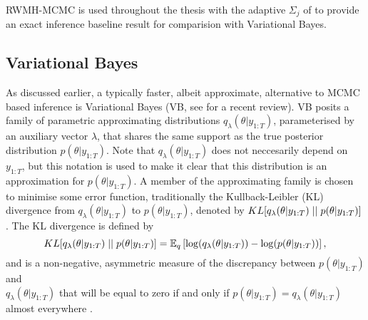 \documentclass[
12pt, %
onehalfspacing, %
nohyperref, %
headsepline, %
chapterinoneline, %
]{MastersDoctoralThesis} %
\begin{document}
RWMH-MCMC is used throughout the thesis with the adaptive $\Sigma_j$ of \citet{Garthwaite2016} to provide an exact inference baseline result for comparision with Variational Bayes.

\subsection{Variational Bayes} \label{subsec:VB}

As discussed earlier, a typically faster, albeit approximate, alternative to MCMC based inference is Variational Bayes (VB, see \citet{Blei2017} for a recent review). VB posits a family of parametric approximating distributions $q_{\lambda}(\theta | y_{1:T})$, parameterised by an auxiliary vector $\lambda$, that shares the same support as the true posterior distribution $p(\theta | y_{1:T})$. Note that $q_{\lambda}(\theta | y_{1:T})$ does not neccesarily depend on $y_{1:T}$, but this notation is used to make it clear that this distribution is an approximation for $p(\theta | y_{1:T})$. A member of the approximating family is chosen to minimise some error function, traditionally the Kullback-Leibler (KL) divergence from $q_{\lambda}(\theta | y_{1:T})$ to $p(\theta | y_{1:T})$, denoted by $KL[q_{\lambda}(\theta | y_{1:T})\hspace{.1cm}||\hspace{.1cm}p(\theta | y_{1:T})]$ \citep{Kullback1951}. The KL divergence is defined by
\begin{equation}
\label{VB:KL-def}
KL[q_{\lambda}(\theta | y_{1:T})\hspace{.1cm}||\hspace{.1cm}p(\theta | y_{1:T})] = \mathbb{E}_{q} \left[ \log(q_{\lambda}(\theta | y_{1:T})) - \log(p(\theta | y_{1:T})) \right],
\end{equation}
and is a non-negative, asymmetric measure of the discrepancy between $p(\theta | y_{1:T})$ and \\ $q_{\lambda}(\theta | y_{1:T})$  that will be equal to zero if and only if $p(\theta | y_{1:T}) = q_{\lambda}(\theta | y_{1:T})$ almost everywhere \citep{Bishop2006}.
\\
\end{document}
